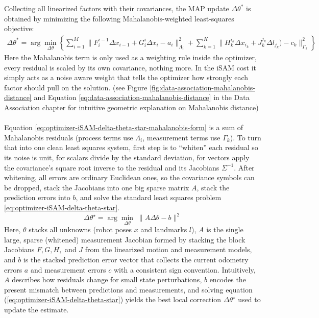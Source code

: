 \\ \\
Collecting all linearized factors with their covariances, the MAP update $\Delta\theta^{*}$ is obtained by minimizing the following Mahalanobis-weighted least-squares objective:
\begin{equation}
    \begin{aligned}
        \Delta\theta^{*} = 
        \arg\min_{\Delta\theta}\left\{ 
            \sum_{i=1}^{M}{\|F_{i}^{i-1}\Delta x_{i-1} + G_{i}^{i}\Delta x_{i} - a_i\|_{\Lambda_i}^{2}} +
            \sum_{k=1}^{K}{\|H_{k}^{i_k}\Delta x_{i_k} + J_{k}^{j_k} \Delta l_{j_k}) - c_k\|_{\Gamma_k}^{2}}
            \right\}
    \end{aligned}
    \label{eq:optimizer-iSAM-delta-theta-star-mahalanobis-form}
\end{equation}
Here the Mahalanobis term is only used as a weighting rule inside the optimizer, every residual is scaled by its own covariance, nothing more. In the iSAM cost it simply acts as a noise aware weight that tells the optimizer how strongly each factor should pull on the solution. (see Figure \ref{fig:data-association-mahalanobis-distance} and Equation \eqref{eq:data-association-mahalanobis-distance} in the Data Association chapter for intuitive geometric explanation on Mahalanobis distance)
\\ \\
Equation \eqref{eq:optimizer-iSAM-delta-theta-star-mahalanobis-form} is a sum of Mahalanobis residuals (process terms use $\Lambda_i$, measurement terms use $\Gamma_k$). To turn that into one clean least squares system, first step is to ``whiten'' each residual so its noise is unit, for scalars divide by the standard deviation, for vectors apply the covariance's square root inverse to the residual and its Jacobians $\Sigma^{-1}$. After whitening, all errors are ordinary Euclidean ones, so the covariance symbols can be dropped, stack the Jacobians into one big sparse matrix $A$, stack the prediction errors into $b$, and solve the standard least squares problem \eqref{eq:optimizer-iSAM-delta-theta-star}.
\begin{equation}
    \Delta\theta^\star = \arg\min_{\Delta\theta}\; \|A\Delta\theta - b\|^2
    \label{eq:optimizer-iSAM-delta-theta-star}
\end{equation}
Here, $\theta$ stacks all unknowns (robot poses $x$ and landmarks $l$), $A$ is the single large, sparse (whitened) measurement Jacobian formed by stacking the block Jacobians $F, G, H,$ and $J$ from the linearized motion and measurement models, and $b$ is the stacked prediction error vector that collects the current odometry errors $a$ and measurement errors $c$ with a consistent sign convention. Intuitively, $A$ describes how residuals change for small state perturbations, $b$ encodes the present mismatch between predictions and measurements, and solving equation (\ref{eq:optimizer-iSAM-delta-theta-star}) yields the best local correction $\Delta\theta^\star$ used to update the estimate.
